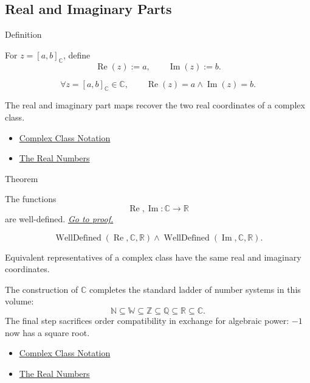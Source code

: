 \subsection*{Real and Imaginary Parts}

\begin{definitionbox}{Definition}
\begin{definition}
\label{def:real-and-imaginary-parts}
For \(z=[a,b]_{\mathbb{C}}\), define
\[
\operatorname{Re}(z):=a,
\qquad
\operatorname{Im}(z):=b.
\]
\end{definition}
\end{definitionbox}

\begin{remark*}
\[
\forall z=[a,b]_{\mathbb{C}}\in\mathbb{C},\qquad
\operatorname{Re}(z)=a\land \operatorname{Im}(z)=b.
\]
\end{remark*}

\begin{remark*}[Interpretation]
The real and imaginary part maps recover the two real coordinates of a complex class.
\end{remark*}

\begin{dependencies}
\begin{itemize}
  \item \hyperref[def:complex-class-notation]{Complex Class Notation}
  \item \hyperref[def:reals]{The Real Numbers}
\end{itemize}
\end{dependencies}

\begin{theorembox}{Theorem}
\begin{theorem}
\label{thm:real-imaginary-parts-well-defined}
The functions
\[
\operatorname{Re},\operatorname{Im}:\mathbb{C}\to\mathbb{R}
\]
are well-defined.
\hyperref[prf:real-imaginary-parts-well-defined]{\textit{Go to proof.}}
\end{theorem}
\end{theorembox}

\begin{remark*}
\[
\operatorname{WellDefined}(\operatorname{Re},\mathbb{C},\mathbb{R})
\land
\operatorname{WellDefined}(\operatorname{Im},\mathbb{C},\mathbb{R}).
\]
\end{remark*}

\begin{remark*}[Interpretation]
Equivalent representatives of a complex class have the same real and imaginary coordinates.


The construction of \(\mathbb{C}\) completes the standard ladder of number
systems in this volume:
\[
\mathbb{N}\subseteq\mathbb{W}\subseteq\mathbb{Z}\subseteq
\mathbb{Q}\subseteq\mathbb{R}\subseteq\mathbb{C}.
\]
The final step sacrifices order compatibility in exchange for algebraic power:
\(-1\) now has a square root.
\end{remark*}

\begin{dependencies}
\begin{itemize}
  \item \hyperref[def:complex-class-notation]{Complex Class Notation}
  \item \hyperref[def:reals]{The Real Numbers}
\end{itemize}
\end{dependencies}
